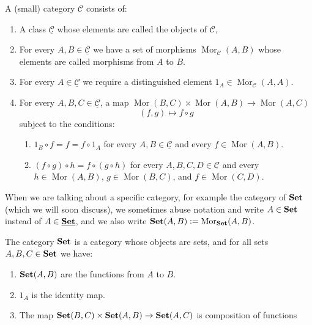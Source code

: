 \documentclass[11pt,a4paper]{article}
\DeclareMathOperator{\Mor}{Mor}
\newcommand{\cC}{\mathcal C}
\newcommand{\ucC}{\underline{\cC}}
\begin{document}
\begin{definition}
  A (small) category $\cC$ consists of:
  \begin{enumerate}
    \item[(1)] A class $\ucC$ whose elements are called
      the objects of $\mathcal C$,
    \item[(2)] For every $A,B \in \ucC$
      we have a set of morphisms $\Mor_{\cC}(A,B)$ whose elements are called
      morphisms from $A$ to $B$.
    \item[(3)] For every $A \in \ucC$ we require a distinguished element
      $1_A \in \Mor_{\mathcal C}(A,A)$.
    \item[(4)] For every $A,B,C \in \ucC$,
      a map $\Mor(B,C) \times \Mor(A,B) \to \Mor(A,C)$
      \[
        (f,g) \mapsto f \circ g
      \]
      subject to the conditions:
      \begin{enumerate}
        \item[(a)] $1_B \circ f = f = f \circ 1_A$ for every $A,B \in \ucC$
          and every $f \in \Mor(A,B)$.
        \item[(b)] $(f \circ g) \circ h = f \circ (g \circ h)$ for every
          $A,B,C,D \in \ucC$
          and every $h \in \Mor(A,B)$, $g \in \Mor(B,C)$, and $f \in \Mor(C,D)$.
      \end{enumerate}
  \end{enumerate}
\end{definition}

\begin{remark}
  When we are talking about a specific category,
  for example the category of $\mathbf{Set}$ (which we will soon discuss),
  we sometimes abuse notation and write $A \in \mathbf{Set}$ instead of
  $A \in \underline{\mathbf{Set}}$, and we also write $\Set(A,B) := \Mor_{\Set}(A,B)$.
\end{remark}

\begin{example}
  The category $\mathbf{Set}$ is a category whose objects are sets,
  and for all sets $A,B,C \in \mathbf{Set}$ we have:
  \begin{enumerate}
    \item[(1)] $\mathbf{Set}(A,B)$ are the functions from $A$ to $B$.
    \item[(2)] $1_A$ is the identity map.
    \item[(3)] The map $\mathbf{Set}(B,C) \times \mathbf{Set}(A,B) \to \mathbf{Set}(A,C)$ is composition
      of functions
  \end{enumerate}
\end{example}
\end{document}
